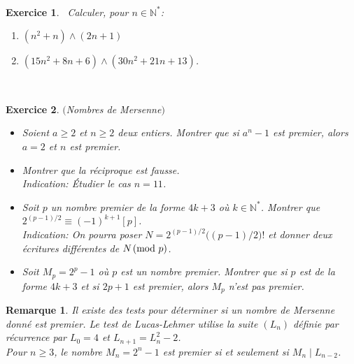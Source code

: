 \documentclass[11pt,a4paper]{article}
\newtheorem{ex}{Exercice}
\newtheorem*{rem}{Remarque}
\begin{document}
\


\begin{comment}
\begin{ex}\
On suppose qu'on dispose d'un algorithme de test de primalité TestPrim$($n$)$ qui renvoie vrai si $n$ est premier et faux sinon. A partir de cet algorithme, écrire un algorithme PreSui$($n$)$ qui, à partir d'un entier naturel $n$, renvoie le plus petit nombre premier strictement supérieur à $n$.
\end{ex}

\
\end{comment}

\begin{ex}\label{exPGCD_Polynomes}\
Calculer, pour $n \in \mathbb{N}^*$:
\begin{enumerate}
\item $ (n^2+n) \wedge (2n+1)$
\item $(15n^2+8n+6)\wedge (30 n^2+21n+13)$.
\end{enumerate}
\end{ex}


\


\begin{ex}\label{exNombres_Mersenne}$($Nombres de Mersenne$)$
\begin{itemize}
\item[$1.$] Soient $a \geqslant 2$ et $n \geqslant 2$ deux entiers. Montrer que si $a^n-1$ est premier, alors $a=2$ et $n$ est premier. 
\item[$2.$] Montrer que la réciproque est fausse.\\
\textit{Indication: Étudier le cas $n=11$.}
\item[$3.$] Soit $p$ un nombre premier de la forme $4k+3$ où $k \in \mathbb{N}^*$. Montrer que $2^{(p-1)/2}\equiv (-1)^{k+1}[p]$.\\
\textit{Indication: On pourra poser $N=2^{(p-1)/2}\big( (p-1)/2 \big)!$ et donner deux écritures différentes de $N \! \! \pmod p$. }
\item[$4.$] Soit $M_p=2^p-1$ où $p$ est un nombre premier. Montrer que si $p$ est de la forme $4k+3$ et si $2p+1$ est premier, alors $M_p$ n'est pas premier.  
\end{itemize}

\end{ex}


\begin{rem}
Il existe des tests pour déterminer si un nombre de Mersenne donné est premier. Le test de Lucas-Lehmer utilise la suite $(L_n)$ définie par récurrence par $L_0=4$ et $L_{n+1}=L_n^2-2$.\\
Pour $n \geqslant 3$, le nombre $M_n= 2^n -1$ est premier si et seulement si $M_n \mid L_{n-2}$. 
\end{rem}
\end{document}
